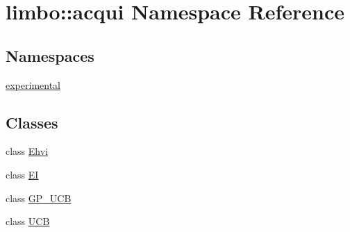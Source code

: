 \hypertarget{namespacelimbo_1_1acqui}{}\section{limbo\+:\+:acqui Namespace Reference}
\label{namespacelimbo_1_1acqui}
\subsection*{Namespaces}
\begin{DoxyCompactItemize}
\item 
 \hyperlink{namespacelimbo_1_1acqui_1_1experimental}{experimental}
\end{DoxyCompactItemize}
\subsection*{Classes}
\begin{DoxyCompactItemize}
\item 
class \hyperlink{classlimbo_1_1acqui_1_1_ehvi}{Ehvi}
\item 
class \hyperlink{classlimbo_1_1acqui_1_1_e_i}{E\+I}
\item 
class \hyperlink{classlimbo_1_1acqui_1_1_g_p___u_c_b}{G\+P\+\_\+\+U\+C\+B}
\item 
class \hyperlink{classlimbo_1_1acqui_1_1_u_c_b}{U\+C\+B}
\end{DoxyCompactItemize}
